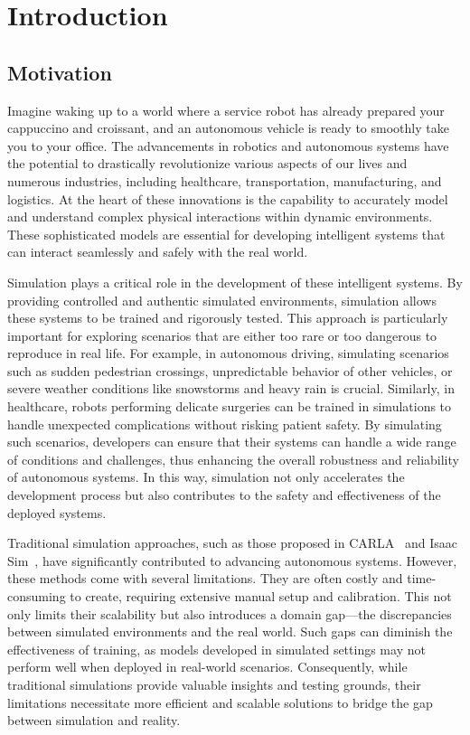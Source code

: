\chapter{Introduction} 
\section{Motivation}
Imagine waking up to a world where a service robot has already prepared your cappuccino and croissant, and an autonomous vehicle is ready to smoothly take you to your office. The advancements in robotics and autonomous systems have the potential to drastically revolutionize various aspects of our lives and numerous industries, including healthcare, transportation, manufacturing, and logistics. At the heart of these innovations is the capability to accurately model and understand complex physical interactions within dynamic environments. These sophisticated models are essential for developing intelligent systems that can interact seamlessly and safely with the real world.

Simulation plays a critical role in the development of these intelligent systems. By providing controlled and authentic simulated environments, simulation allows these systems to be trained and rigorously tested. This approach is particularly important for exploring scenarios that are either too rare or too dangerous to reproduce in real life. For example, in autonomous driving, simulating scenarios such as sudden pedestrian crossings, unpredictable behavior of other vehicles, or severe weather conditions like snowstorms and heavy rain is crucial. Similarly, in healthcare, robots performing delicate surgeries can be trained in simulations to handle unexpected complications without risking patient safety. By simulating such scenarios, developers can ensure that their systems can handle a wide range of conditions and challenges, thus enhancing the overall robustness and reliability of autonomous systems. In this way, simulation not only accelerates the development process but also contributes to the safety and effectiveness of the deployed systems.

Traditional simulation approaches, such as those proposed in CARLA~\cite{dosovitskiy2017carla} and Isaac Sim~\cite{makoviychuk2021isaac}, have significantly contributed to advancing autonomous systems. However, these methods come with several limitations. They are often costly and time-consuming to create, requiring extensive manual setup and calibration. This not only limits their scalability but also introduces a domain gap—the discrepancies between simulated environments and the real world. Such gaps can diminish the effectiveness of training, as models developed in simulated settings may not perform well when deployed in real-world scenarios. Consequently, while traditional simulations provide valuable insights and testing grounds, their limitations necessitate more efficient and scalable solutions to bridge the gap between simulation and reality.

